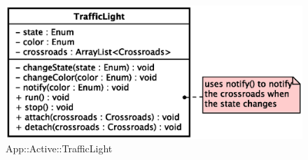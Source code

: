 \begin{figure}[h]
\centering
\includegraphics[scale=0.6,keepaspectratio]{images/solution/traffic_light.eps}
\caption{App::Active::TrafficLight}
\label{fig:sd-app-traffic-light}
\end{figure}
\FloatBarrier
